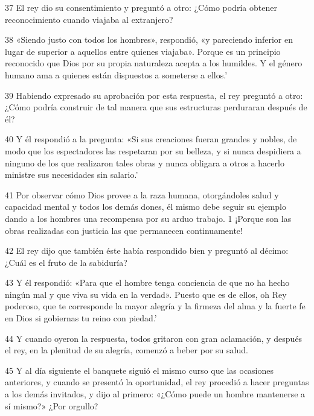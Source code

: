 \par 37 El rey dio su consentimiento y preguntó a otro: ¿Cómo podría obtener reconocimiento cuando viajaba al extranjero?

\par 38 «Siendo justo con todos los hombres», respondió, «y pareciendo inferior en lugar de superior a aquellos entre quienes viajaba». Porque es un principio reconocido que Dios por su propia naturaleza acepta a los humildes. Y el género humano ama a quienes están dispuestos a someterse a ellos.'

\par 39 Habiendo expresado su aprobación por esta respuesta, el rey preguntó a otro: ¿Cómo podría construir de tal manera que sus estructuras perduraran después de él?

\par 40 Y él respondió a la pregunta: «Si sus creaciones fueran grandes y nobles, de modo que los espectadores las respetaran por su belleza, y si nunca despidiera a ninguno de los que realizaron tales obras y nunca obligara a otros a hacerlo ministre sus necesidades sin salario.'

\par 41 Por observar cómo Dios provee a la raza humana, otorgándoles salud y capacidad mental y todos los demás dones, él mismo debe seguir su ejemplo dando a los hombres una recompensa por su arduo trabajo. 1 ¡Porque son las obras realizadas con justicia las que permanecen continuamente!

\par 42 El rey dijo que también éste había respondido bien y preguntó al décimo: ¿Cuál es el fruto de la sabiduría?

\par 43 Y él respondió: «Para que el hombre tenga conciencia de que no ha hecho ningún mal y que viva su vida en la verdad». Puesto que es de ellos, oh Rey poderoso, que te corresponde la mayor alegría y la firmeza del alma y la fuerte fe en Dios si gobiernas tu reino con piedad.'

\par 44 Y cuando oyeron la respuesta, todos gritaron con gran aclamación, y después el rey, en la plenitud de su alegría, comenzó a beber por su salud.

\par 45 Y al día siguiente el banquete siguió el mismo curso que las ocasiones anteriores, y cuando se presentó la oportunidad, el rey procedió a hacer preguntas a los demás invitados, y dijo al primero: «¿Cómo puede un hombre mantenerse a sí mismo?» ¿Por orgullo?

